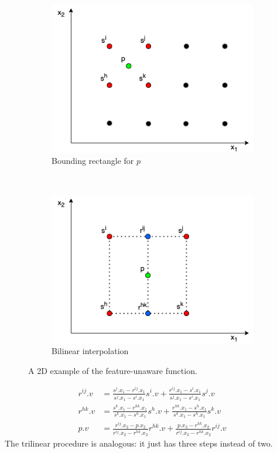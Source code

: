 \begin{figure}[t]
\centering
\begin{subfigure}[t]{.45\textwidth}
\centering
\includegraphics[scale=.4]{chapters/physics-aware/pluto/img/statistical_profiling_function.png}
\caption{Bounding rectangle for $p$}
\label{pluto-fig:statistical-profiling-function}
\end{subfigure}
~
\begin{subfigure}[t]{.45\textwidth}
\centering
\includegraphics[scale=.4]{chapters/physics-aware/pluto/img/bilinear_interpolation.png}
\caption{Bilinear interpolation}
\label{pluto-fig:bilinear-interpolation}
\end{subfigure}
\caption{A 2D example of the feature-unaware function.}
\label{pluto-fig:statistical-profiling-function-explanation}
\end{figure}


\begin{align*}
    r^{ij}.v &= \frac{s^j.x_1-r^{ij}.x_1}{s^j.x_1-s^i.x_1} s^i.v + \frac{r^{ij}.x_1-s^i.x_1}{s^j.x_1-s^i.x_1} s^j.v\\
    r^{hk}.v &= \frac{s^k.x_1-r^{hk}.x_1}{s^k.x_1-s^h.x_1} s^h.v + \frac{r^{hk}.x_1-s^h.x_1}{s^k.x_1-s^h.x_1} s^k.v \\
    p.v &= \frac{r^{ij}.x_2-p.x_2}{r^{ij}.x_2-r^{hk}.x_2} r^{hk}.v + \frac{p.x_2-r^{hk}.x_2}{r^{ij}.x_2-r^{hk}.x_2} r^{ij}.v
\end{align*}
The trilinear procedure is analogous: it just has three steps instead of two.


